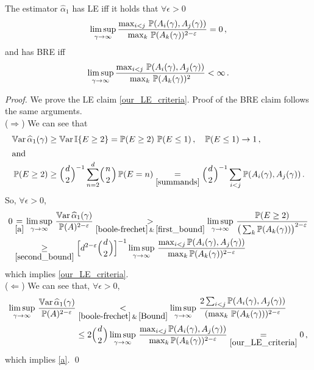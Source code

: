 \begin{Proposition} \label{prop:efficiency}
	The estimator $\hat{\alpha}_1$ has LE iff it holds that $\forall \epsilon > 0$
	\begin{equation}\label{our_LE_criteria}
	  \limsup_{\gamma\to\infty}
		\dfrac{\max_{i < j} \, \operatorname{{\mathbb P}}(A_i(\gamma), A_j(\gamma))}{\max_k \, \operatorname{{\mathbb P}}(A_k(\gamma))^{2-\varepsilon}} = 0 \,,
	\end{equation}
	and has BRE iff
	\begin{equation}\label{our_BRE_criteria}
	  \limsup_{\gamma\to\infty}
		\dfrac{\max_{i < j} \, \operatorname{{\mathbb P}}(A_i(\gamma), A_j(\gamma))}{\max_k \, \operatorname{{\mathbb P}}(A_k(\gamma))^2} < \infty \,.
	\end{equation}
\end{Proposition}
\begin{proof} 
	We prove the LE claim \eqref{our_LE_criteria}. Proof of the BRE claim follows the same arguments. \\
	($\Rightarrow$) We can see that
	\begin{align} 
		\operatorname{\mathbb{V}\mathrm{ar}} \widehat{\alpha}_1(\gamma) &\ge \operatorname{\mathbb{V}\mathrm{ar}} \mathbb I\{E \ge 2\} = \operatorname{{\mathbb P}}(E \ge 2) \, \operatorname{{\mathbb P}}(E \le 1) \,, \quad \operatorname{{\mathbb P}}(E \le 1)\to1 \,,  \label{first_bound} \\
	\intertext{and}		
		\operatorname{{\mathbb P}}(E \ge 2) &\ge \Bigl({{d}\atop2}\Bigr)^{-1} \sum_{n=2}^d \Bigl({{n}\atop2}\Bigr) \operatorname{{\mathbb P}}(E = n) \underset{\eqref{summands}}{=} \Bigl({{d}\atop2}\Bigr)^{-1} \sum_{i<j} \operatorname{{\mathbb P}}(A_i(\gamma), A_j(\gamma)) \label{second_bound} \,.
	\end{align}
	So, $\forall \epsilon > 0$,
	\begin{align*}
		0 &\underset{\eqref{a}}{=} \limsup_{\gamma\to\infty}\,\frac{\operatorname{\mathbb{V}\mathrm{ar}}\widehat{\alpha}_1(\gamma)}{\operatorname{{\mathbb P}}(A)^{2-\varepsilon}} 
		\underset{\eqref{boole-frechet} \,\&\,\eqref{first_bound}}{>} \limsup_{\gamma\to\infty}\,\frac{\operatorname{{\mathbb P}}(E \ge 2)}{\big(\sum_k \operatorname{{\mathbb P}}(A_k(\gamma))\big)^{2-\varepsilon}} \\
		&\underset{\eqref{second_bound}}{\ge} \Big[ d^{2-\varepsilon} \Bigl({{d}\atop2}\Bigr) \Big]^{-1} \limsup_{\gamma\to\infty}\,\frac{\max_{i < j}\operatorname{{\mathbb P}}(A_i(\gamma), A_j(\gamma))}{\max_k 
		 \operatorname{{\mathbb P}}(A_k(\gamma))^{2-\varepsilon}}
	\end{align*}
	which implies \eqref{our_LE_criteria}. \\
	($\Leftarrow$) We can see that, $\forall \epsilon > 0$,
	\begin{align*}
		\limsup_{\gamma\to\infty}\,\frac{\operatorname{\mathbb{V}\mathrm{ar}}\widehat{\alpha}_1(\gamma)}{\operatorname{{\mathbb P}}(A)^{2-\varepsilon}}
		&\underset{\eqref{boole-frechet} \,\&\, \eqref{Bound}}{<} \limsup_{\gamma\to\infty}\,\frac{2 \sum_{i<j}\operatorname{{\mathbb P}}(A_i(\gamma), A_j(\gamma))}
		{(\max_k \, \operatorname{{\mathbb P}}(A_k(\gamma)))^{2-\varepsilon}} \\
		&\le 2\Bigl({{d}\atop2}\Bigr) \limsup_{\gamma\to\infty}\,\frac{\max_{i < j}
		 \operatorname{{\mathbb P}}(A_i(\gamma), A_j(\gamma))}
		{\max_k \operatorname{{\mathbb P}}(A_k(\gamma))^{2-\varepsilon}} 
		\underset{\eqref{our_LE_criteria}}{=} 0 \,,
	\end{align*}
	which implies \eqref{a}. \qed
\end{proof}

